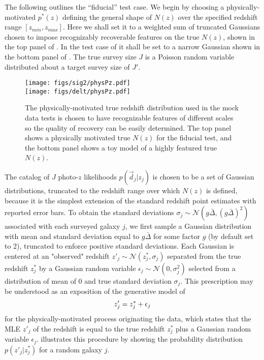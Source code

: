 The following outlines the ``fiducial'' test case.  
We begin by choosing a physically-motivated $p^{*}(z)$ defining the general shape of $N(z)$ over the specified redshift range $[z_{min},z_{max}]$.  
Here we shall set it to a weighted sum of truncated Gaussians chosen to impose recognizably recoverable features on the true $N(z)$, shown in the top panel of .  
In the test case of  it shall be set to a narrow Gaussian shown in the bottom panel of .  
The true survey size $J$ is a Poisson random variable distributed about a target survey size of $J'$.

\begin{figure}
	\texttt{[image: figs/sig2/physPz.pdf]}\\
	\texttt{[image: figs/delt/physPz.pdf]}
	\caption{The physically-motivated true redshift distribution used in the mock data tests is chosen to have recognizable features of different scales so the quality of recovery can be easily determined.  
		The top panel shows a physically motivated true $N(z)$ for the fiducial test, and the bottom panel shows a toy model of a highly featured true $N(z)$.}
\end{figure}

The catalog of $J$ photo-$z$ likelihoods $p(\vec{d}_{j}|z_{j})$ is chosen to be a set of Gaussian distributions, truncated to the redshift range over which $N(z)$ is defined, because it is the simplest extension of the standard redshift point estimates with reported error bars.  
To obtain the standard deviations $\sigma_{j}\sim\mathcal{N}(g\bar{\Delta},(g\bar{\Delta})^{2})$ associated with each surveyed galaxy $j$, we first sample a Gaussian 
distribution with mean and standard deviation equal to $g\bar{\Delta}$ for some factor $g$ (by default set to 2), truncated to enforce positive standard deviations.  
Each Gaussian is centered at an "observed" redshift $z'_{j}\sim\mathcal{N}(z^{*}_{j},\sigma_{j})$ separated from the true redshift $z^{*}_{j}$ by a Gaussian random variable $\epsilon_{j}\sim\mathcal{N}(0,\sigma^{2}_{j})$ selected from a distribution of mean of 0 and true standard deviation $\sigma_{j}$.   
This prescription may be understood as an exposition of the generative model of 
\begin{equation}
\eqlabel{eq:genmod}
z'_{j} = z^{*}_{j}+\epsilon_{j}
\end{equation}
for the physically-motivated process originating the data, which states that the MLE $z'_{j}$ of the redshift is equal to the true redshift $z^{*}_{j}$ plus a Gaussian random variable $\epsilon_{j}$.  
 illustrates this procedure by showing the probability distribution $p(z'_{j}|z^{*}_{j})$ for a random galaxy $j$.

